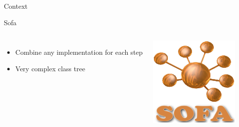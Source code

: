 \documentclass[xcolor={usenames,dvipsnames}]{beamer}
\begin{document}
\begin{frame}{Context}
\begin{alertblock}{Sofa \cite{Allard07SOFA,Faure11Sparse,Nesme09Preserving}}
\begin{columns}
\begin{itemize}[<+->]
                \item Combine any implementation for each step
                \item Very complex class tree
            \end{itemize}
            \includegraphics[width=.9\textwidth]{sofa.png}
        \end{columns}
    \end{alertblock}
\end{frame}
\end{document}
